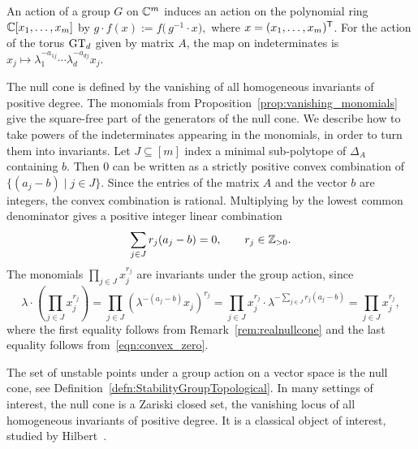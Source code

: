 \begin{remark} %
	\label{rem:realnullcone} %
	An action of a group $G$ on $\mathbb C^m$ induces an action on the polynomial ring $\mathbb C[x_1,\ldots,x_m]$ by
	$g \cdot f(x) := f\big( \, g^{-1} \cdot x \big),$
	where $x = (x_1,\ldots,x_m)^{\mathsf{T}}$. For the action of the torus $\operatorname{GT}_d$ given by matrix $A$, the map on indeterminates is $x_j \mapsto \lambda_1^{-a_{1j}}  \cdots \lambda_d^{-a_{dj}} x_j$.
	\hfill\remSymbol
\end{remark}


The null cone is defined by the vanishing of all homogeneous invariants of positive degree. The monomials from Proposition~\ref{prop:vanishing_monomials} give the square-free part of the generators of the null cone. We describe how to take powers of the indeterminates appearing in the monomials, in order to turn them into invariants.
Let $J \subseteq [m]$ index a minimal sub-polytope of $\Delta_A$ containing $b$. Then $0$ can be written as a strictly positive convex combination of 
$\{ (a_j -b) \mid j \in J \}$.
Since the entries of the matrix $A$ and the vector $b$ are integers, the convex combination is rational. Multiplying by the lowest common denominator gives a positive integer linear combination
\begin{equation}
	\label{eqn:convex_zero}
	\sum_{j \in J} r_j (a_j -b) = 0 ,  \qquad r_j \in \mathbb Z_{>0}.
\end{equation}
The monomials $\prod_{j \in J} x_j^{r_j}$ are invariants under the group action, since
\[ \lambda \cdot \left( \prod_{j \in J} x_j^{r_j} \right) = \prod_{j \in J} \left( \lambda^{-(a_j - b)} x_j \right)^{r_j} = \prod_{j \in J} x_j^{r_j} \cdot \lambda^{- \sum_{j \in J} r_j (a_j - b)} =  \prod_{j \in J} x_j^{r_j} , \]
where the first equality follows from Remark~\ref{rem:realnullcone} and the last equality follows from~\eqref{eqn:convex_zero}. 



The set of unstable points under a group action on a vector space is the null cone, see Definition~\ref{defn:StabilityGroupTopological}. In many settings of interest, the null cone is a Zariski closed set, the vanishing locus of all homogeneous invariants of positive degree.
It is a classical object of interest, studied by Hilbert~\cite{Hilbert1890}.


